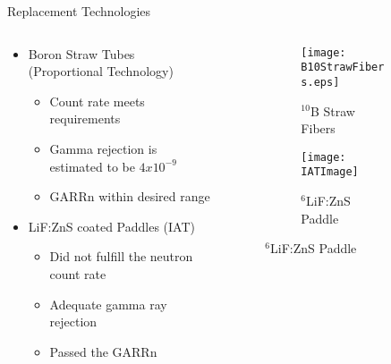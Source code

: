 \begin{frame}[fragile]{Replacement Technologies}
\begin{columns}[onlytextwidth]
\begin{column}{0.55\textwidth}
\begin{itemize}
	\small
	\item Boron Straw Tubes (Proportional Technology) \cite{kouzes_boron-lined_2012}
	\begin{itemize}
		\item Count rate meets requirements
		\item Gamma rejection is estimated to be $4x10^{-9}$
		\item GARRn within desired range
	\end{itemize}
	\small
	\item LiF:ZnS coated Paddles (IAT) \cite{kouzes_lithium_2010}
	\begin{itemize}
		\item Did not fulfill the neutron count rate
		\item Adequate gamma ray rejection
		\item Passed the GARRn
	\end{itemize}
\end{itemize}
\end{column}
\begin{column}{0.4\textwidth}
	\begin{figure}
	  \vspace*{-6cm}
    \centering
    \begin{subfigure}[b]{\textwidth}
      \centering
		  \texttt{[image: B10StrawFibers.eps]}
      \caption{ ${}^{10}$B Straw Fibers}
      \label{fig:B10StrawFibers}
    \end{subfigure}

    \begin{subfigure}[b]{\textwidth}
      \texttt{[image: IATImage]}
      \caption{${}^6$LiF:ZnS Paddle}
      \label{fig:LifZnSPaddle}
    \end{subfigure}
	\end{figure}
\end{column}
\end{columns}
\end{frame}
